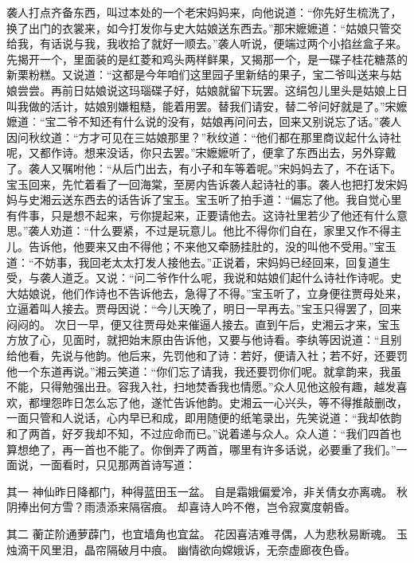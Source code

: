 \documentclass[12pt,oneside]{book}
\begin{document}
袭人打点齐备东西，叫过本处的一个老宋妈妈来，向他说道：“你先好生梳洗了，换了出门的衣裳来，如今打发你与史大姑娘送东西去。”那宋嬷嬷道：“姑娘只管交给我，有话说与我，我收拾了就好一顺去。”袭人听说，便端过两个小掐丝盒子来。先揭开一个，里面装的是红菱和鸡头两样鲜果，又揭那一个，是一碟子桂花糖蒸的新栗粉糕。又说道：“这都是今年咱们这里园子里新结的果子，宝二爷叫送来与姑娘尝尝。再前日姑娘说这玛瑙碟子好，姑娘就留下玩罢。这绢包儿里头是姑娘上日叫我做的活计，姑娘别嫌粗糙，能着用罢。替我们请安，替二爷问好就是了。”宋嬷嬷道︰“宝二爷不知还有什么说的没有，姑娘再问问去，回来又别说忘了话。”袭人因问秋纹道：“方才可见在三姑娘那里？”秋纹道：“他们都在那里商议起什么诗社呢，又都作诗。想来没话，你只去罢。”宋嬷嬷听了，便拿了东西出去，另外穿戴了。袭人又嘱咐他：“从后门出去，有小子和车等着呢。”宋妈妈去了，不在话下。
宝玉回来，先忙着看了一回海棠，至房内告诉袭人起诗社的事。袭人也把打发宋妈妈与史湘云送东西去的话告诉了宝玉。宝玉听了拍手道：“偏忘了他。我自觉心里有件事，只是想不起来，亏你提起来，正要请他去。这诗社里若少了他还有什么意思。”袭人劝道：“什么要紧，不过是玩意儿。他比不得你们自在，家里又作不得主儿。告诉他，他要来又由不得他；不来他又牵肠挂肚的，没的叫他不受用。”宝玉道：“不妨事，我回老太太打发人接他去。”正说着，宋妈妈已经回来，回复道生受，与袭人道乏。又说：“问二爷作什么呢，我说和姑娘们起什么诗社作诗呢。史大姑娘说，他们作诗也不告诉他去，急得了不得。”宝玉听了，立身便往贾母处来，立逼着叫人接去。贾母因说：“今儿天晚了，明日一早再去。”宝玉只得罢了，回来闷闷的。
次日一早，便又往贾母处来催逼人接去。直到午后，史湘云才来，宝玉方放了心，见面时，就把始末原由告诉他，又要与他诗看。李纨等因说道：“且别给他看，先说与他韵。他后来，先罚他和了诗：若好，便请入社；若不好，还要罚他一个东道再说。”湘云笑道：“你们忘了请我，我还要罚你们呢。就拿韵来，我虽不能，只得勉强出丑。容我入社，扫地焚香我也情愿。”众人见他这般有趣，越发喜欢，都埋怨昨日怎么忘了他，遂忙告诉他韵。史湘云一心兴头，等不得推敲删改，一面只管和人说话，心内早已和成，即用随便的纸笔录出，先笑说道：“我却依韵和了两首，好歹我却不知，不过应命而已。”说着递与众人。众人道：“我们四首也算想绝了，再一首也不能了。你倒弄了两首，哪里有许多话说，必要重了我们。”一面说，一面看时，只见那两首诗写道：

其一
神仙昨日降都门，种得蓝田玉一盆。
自是霜娥偏爱冷，非关倩女亦离魂。
秋阴捧出何方雪？雨渍添来隔宿痕。
却喜诗人吟不倦，岂令寂寞度朝昏。

其二
蘅芷阶通萝薜门，也宜墙角也宜盆。
花因喜洁难寻偶，人为悲秋易断魂。
玉烛滴干风里泪，晶帘隔破月中痕。
幽情欲向嫦娥诉，无奈虚廊夜色昏。
\end{document}
